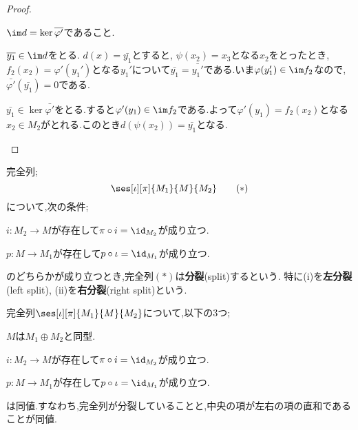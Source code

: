 \begin{proof}
\begin{step}
\begin{sakura}
			\item $\im d=\ker\bar{\varphi'}$であること.
			
			$\bar{y_1}\in\im d$をとる. $d(x)=\bar{y_1}$とすると, $\psi(x_2)=x_3$となる$x_2$をとったとき, $f_2(x_2)=\varphi'(y_1')$となる$y_1'$について$\bar{y_1}=\bar{y_1'}$である.いま$\varphi(y_1')\in\im f_2$なので, $\bar{\varphi'}(\bar{y_1})=0$である.
			
			$\bar{y_1}\in\ker\bar{\varphi'}$をとる.すると$\varphi'(y_1)\in\im f_2$である.よって$\varphi'(y_1)=f_2(x_2)$となる$x_2\in M_2$がとれる.このとき$d(\psi(x_2))=\bar{y_1}$となる.
		\end{sakura}
	\end{step}
\end{proof}

\begin{defi}[分裂完全列]
	完全列;
	\[\ses[\iota][\pi]{M_1}{M}{M_2}\tag{$\ast$}\]
	について,次の条件;
	\begin{sakura}
		\item $i:M_2\to M$が存在して$\pi\circ i=\id_{M_2}$が成り立つ.
		\item $p:M\to M_1$が存在して$p\circ\iota=\id_{M_1}$が成り立つ.
	\end{sakura}
	のどちらかが成り立つとき,完全列$(\ast)$は\textbf{分裂}(split)するという. 特に(i)を\textbf{左分裂}(left split), (ii)を\textbf{右分裂}(right split)という.
\end{defi}

\begin{lem}[分裂補題]
	完全列$\ses[\iota][\pi]{M_1}{M}{M_2}$について,以下の3つ;
	\begin{sakura}
		\item $M$は$M_1\oplus M_2$と同型.
			
		\item $i:M_2\to M$が存在して$\pi\circ i=\id_{M_2}$が成り立つ.
		
		\item $p:M\to M_1$が存在して$p\circ\iota=\id_{M_1}$が成り立つ.
	\end{sakura}
	は同値.すなわち,完全列が分裂していることと,中央の項が左右の項の直和であることが同値.
\end{lem}

